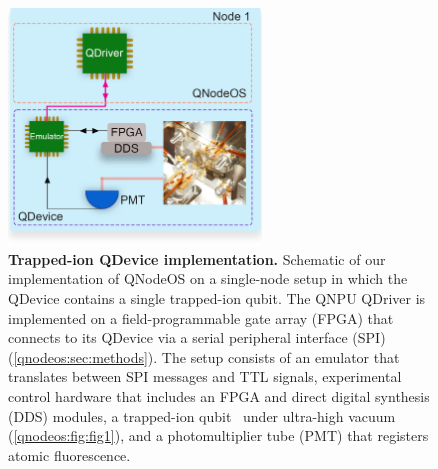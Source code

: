 \begin{figure}[t]
\centering
\includegraphics[width=0.6\textwidth]{figures/qnodeos/main/fig5/fig5.png}
\caption{\textbf{Trapped-ion QDevice implementation.} Schematic of our implementation of QNodeOS on a single-node setup in which the QDevice contains a single trapped-ion qubit. The QNPU QDriver is implemented on a field-programmable gate array (FPGA) that connects to its QDevice via a serial peripheral interface (SPI) (\cref{qnodeos:sec:methods}). The setup consists of an emulator that translates between SPI messages and TTL signals, experimental control hardware that includes an FPGA and direct digital synthesis (DDS) modules, a trapped-ion qubit~\cite{teller2023integrating} under ultra-high vacuum (\cref{qnodeos:fig:fig1}), and a photomultiplier tube (PMT) that registers atomic fluorescence.}
\label{qnodeos:fig:fig5}
\end{figure}